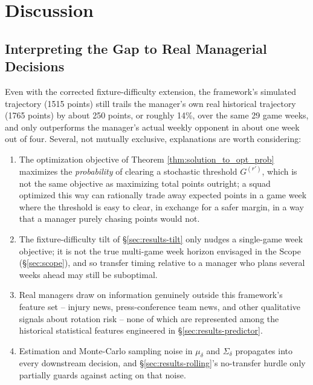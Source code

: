 		\section{Discussion} \label{sec:discussion}
			\subsection{Interpreting the Gap to Real Managerial Decisions}
				Even with the corrected fixture-difficulty extension, the framework's simulated trajectory (1515 points) still trails the manager's own real historical trajectory (1765 points) by about 250 points, or roughly 14\%, over the same 29 game weeks, and only outperforms the manager's actual weekly opponent in about one week out of four. Several, not mutually exclusive, explanations are worth considering:
				\begin{enumerate}
					\item[(i)] The optimization objective of Theorem \ref{thm:solution_to_opt_prob} maximizes the \emph{probability} of clearing a stochastic threshold $G^{(r')}$, which is not the same objective as maximizing total points outright; a squad optimized this way can rationally trade away expected points in a game week where the threshold is easy to clear, in exchange for a safer margin, in a way that a manager purely chasing points would not.
					\item[(ii)] The fixture-difficulty tilt of \S\ref{sec:results-tilt} only nudges a single-game week objective; it is not the true multi-game week horizon envisaged in the Scope (\S\ref{sec:scope}), and so transfer timing relative to a manager who plans several weeks ahead may still be suboptimal.
					\item[(iii)] Real managers draw on information genuinely outside this framework's feature set -- injury news, press-conference team news, and other qualitative signals about rotation risk -- none of which are represented among the historical statistical features engineered in \S\ref{sec:results-predictor}.
					\item[(iv)] Estimation and Monte-Carlo sampling noise in $\mu_\delta$ and $\Sigma_\delta$ propagates into every downstream decision, and \S\ref{sec:results-rolling}'s no-transfer hurdle only partially guards against acting on that noise.
				\end{enumerate}

